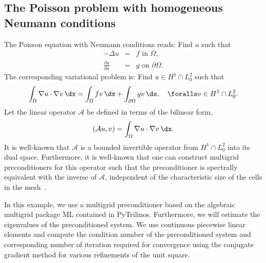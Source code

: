 \subsection{The Poisson problem with homogeneous Neumann conditions}
The Poisson equation with Neumann conditions reads:
Find $u$ such that
\begin{eqnarray}
-\Delta u &= &f \mbox{ in } \Omega,  \\
    \frac{\partial u}{\partial n} &=&  g \mbox{ on } \partial \Omega .
\end{eqnarray}
The corresponding variational problem is:  Find $u\in H^1 \cap L^2_0$ such that
\[
\int_\Omega \nabla u \cdot \nabla v \, \dx = \int_\Omega f v \, \dx +
\int_{\partial \Omega} g v \, \ds, \quad\foralls v \in H^1 \cap L^2_0 .
\]
Let the linear operator $\mathcal{A}$ be defined in terms of the  bilinear form,
\[
(\mathcal{A} u, v) =  \int_\Omega \nabla u \cdot \nabla v \, \dx.
\]
It is well-known that $\mathcal{A}$ is a bounded invertible operator
from $H^1 \cap L^2_0$ into its dual space.  Furthermore, it is
well-known that one can construct multigrid preconditioners for this
operator such that the preconditioner is spectrally equivalent with
the inverse of $\mathcal{A}$, independent of the characteristic size
of the cells in the
mesh~\citep{Bramble1993,Hackbusch1994,TrottenbergOosterleeSchuller2001}.

In this example, we use a multigrid preconditioner based on the
algebraic multigrid package ML contained in
PyTrilinos. Furthermore, we will estimate the
eigenvalues of the preconditioned system. We use continuous piecewise
linear elements and compute the condition number of the preconditioned
system and corresponding number of iteration required for convergence
using the conjugate gradient method
for various refinements of the unit square.

